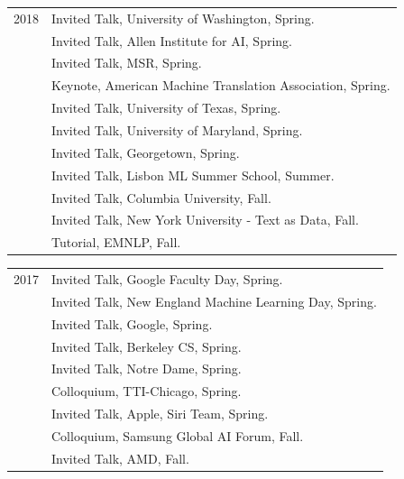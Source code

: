 \documentclass[10pt]{article}
\begin{document}
\hspace{-1cm} \begin{tabular}{lp{11.5cm}}
	2018
	 & \ind   Invited Talk, University of Washington, Spring.            \\
	 & \ind   Invited Talk, Allen Institute for AI, Spring.              \\
	 & \ind   Invited Talk, MSR, Spring.                                 \\
	 & \ind   Keynote, American Machine Translation Association, Spring. \\
	 & \ind   Invited Talk, University of Texas, Spring.                 \\
	 & \ind   Invited Talk, University of Maryland, Spring.              \\
	 & \ind   Invited Talk, Georgetown, Spring.                          \\
	 & \ind   Invited Talk, Lisbon ML Summer School, Summer.             \\
	 & \ind   Invited Talk, Columbia University, Fall.                   \\
	 & \ind   Invited Talk, New York University - Text as Data, Fall.    \\
	 & \ind   Tutorial, EMNLP, Fall.                                     \\
\end{tabular}

\hspace{-1cm} \begin{tabular}{lp{11.5cm}}
	2017
	 & \ind   Invited Talk, Google Faculty Day, Spring.               \\
	 & \ind   Invited Talk, New England Machine Learning Day, Spring. \\
	 & \ind   Invited Talk, Google, Spring.                           \\
	 & \ind   Invited Talk, Berkeley CS, Spring.                      \\
	 & \ind   Invited Talk, Notre Dame, Spring.                       \\
	 & \ind   Colloquium, TTI-Chicago, Spring.                        \\
	 & \ind   Invited Talk, Apple, Siri Team, Spring.                 \\
	 & \ind   Colloquium, Samsung Global AI Forum, Fall.              \\
	 & \ind   Invited Talk, AMD, Fall.                                \\
\end{tabular}
\end{document}

